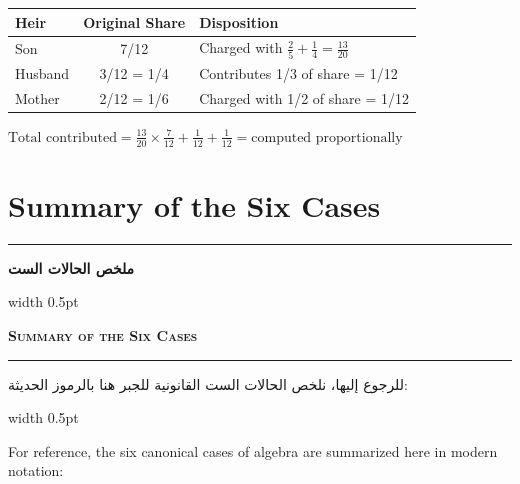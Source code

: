 \documentclass[10pt,a4paper]{book}
\newlength{\colwidth}
\newcommand{\bilingualpair}[2]{%
  \noindent
  \begin{minipage}[t]{\colwidth}
  \begin{flushright}
  \vspace{0pt}
  {\arabicfont\small #1}
  \end{flushright}
  \end{minipage}%
  \hfill\textcolor{columnsepclr}{\vrule width 0.5pt}\hfill
  \begin{minipage}[t]{\colwidth}
  \vspace{0pt}
  {\small #2}
  \end{minipage}%
  \par\vspace{0.6em}
}
\newcommand{\bilingualsectionheader}[2]{%
  \par\vspace{0.8em}
  \noindent
  \begin{minipage}[t]{\colwidth}
  \begin{flushright}
  \textbf{\arabicfont #1}
  \end{flushright}
  \end{minipage}%
  \hfill\textcolor{columnsepclr}{\vrule width 0.5pt}\hfill
  \begin{minipage}[t]{\colwidth}
  \textbf{\textsc{#2}}
  \end{minipage}%
  \par\vspace{0.5em}
}
\begin{document}
\begin{mathbox}
\begin{center}
\begin{tabular}{l|c|l}
\textbf{Heir} & \textbf{Original Share} & \textbf{Disposition} \\
\hline
Son & 7/12 & Charged with $\frac{2}{5} + \frac{1}{4} = \frac{13}{20}$ \\
Husband & 3/12 = 1/4 & Contributes 1/3 of share = 1/12 \\
Mother & 2/12 = 1/6 & Charged with 1/2 of share = 1/12 \\
\end{tabular}
\end{center}

$\text{Total contributed} = \frac{13}{20} \times \frac{7}{12} + \frac{1}{12} + \frac{1}{12} = \text{computed proportionally}$
\end{mathbox}

\newpage


\appendix

\chapter{Summary of the Six Cases}
\label{app:six-cases}

\noindent\textcolor{columnsepclr}{\rule{\textwidth}{0.6pt}}\par\vspace{0.3em}
\bilingualsectionheader{ملخص الحالات الست}{Summary of the Six Cases}
\noindent\textcolor{columnsepclr}{\rule{\textwidth}{0.6pt}}\par\vspace{0.5em}

\bilingualpair{
للرجوع إليها، نلخص الحالات الست القانونية للجبر هنا بالرموز
الحديثة:
}{
For reference, the six canonical cases of algebra are summarized here in
modern notation:
}
\end{document}
